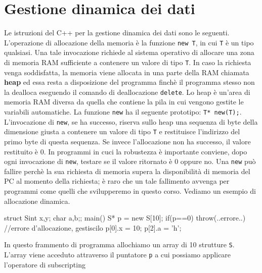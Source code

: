 \section{Gestione dinamica dei dati}
Le istruzioni del C++ per la gestione dinamica dei dati sono le seguenti. L'operazione di allocazione della memoria è la funzione \texttt{new T}, in cui \texttt{T} è un tipo qualsiasi. Una tale invocazione richiede al sistema operativo di allocare una zona di memoria RAM sufficiente a contenere un valore di tipo \texttt{T}. In caso la richiesta venga soddisfatta, la memoria viene allocata in una parte della RAM chiamata \textbf{heap} ed essa resta a disposizione del programma finchè il programma stesso non la dealloca eseguendo il comando di deallocazione \texttt{delete}. 
Lo heap è un'area di memoria RAM diversa da quella che contiene la pila in cui vengono gestite le variabili automatiche. La funzione \texttt{new} ha il seguente prototipo: \texttt{T* new(T);}. L'invocazione di \texttt{new}, se ha successo, riserva sullo heap una sequenza di byte della dimensione giusta a contenere un valore di tipo \texttt{T} e restituisce l'indirizzo del primo byte di questa sequenza. Se invece l'allocazione non ha successo, il valore restituito è 0. In programmi in cuci la robustezza è importante conviene, dopo ogni invocazione di \texttt{new}, testare se il valore ritornato è 0 oppure no. Una \texttt{new} può fallire perchè la sua richiesta di memoria supera la disponibilità di memoria del PC al momento della richiesta; è raro che un tale fallimento avvenga per programmi come quelli che svilupperemo in questo corso. Vediamo un esempio di allocazione dinamica. \\
\begin{codice}

    struct S{int x,y; char a,b;};
    main(){
        S* p = new S[10];
        if(p==0) throw(..errore..) //errore d'allocazione, gestiscilo
        p[0].x = 10;
        p[2].a = 'h';
    }
\end{codice}    
In questo frammento di programma allochiamo un array di 10 strutture \texttt{S}. L'array viene acceduto attraverso il puntatore \texttt{p} a cui possiamo applicare l'operatore di subscripting 